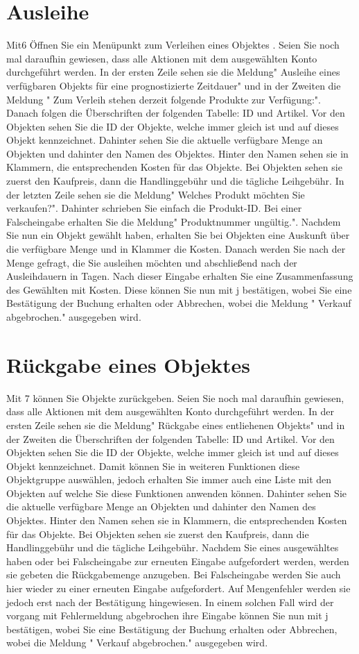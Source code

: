 ﻿\documentclass[a4paper,12pt,titlepage]{article}
\begin{document}
\section{Ausleihe}
Mit6 Öffnen Sie ein Menüpunkt zum Verleihen eines Objektes . Seien Sie noch mal daraufhin gewiesen, dass alle Aktionen mit dem ausgewählten Konto durchgeführt werden.
In der ersten Zeile sehen sie die Meldung" Ausleihe eines verfügbaren Objekts für eine prognostizierte Zeitdauer" und in der Zweiten die Meldung " Zum Verleih stehen derzeit folgende Produkte zur Verfügung:". Danach folgen die Überschriften der folgenden Tabelle: ID und Artikel.
Vor den Objekten sehen Sie die ID der Objekte, welche immer gleich ist und auf dieses Objekt kennzeichnet. 
Dahinter sehen Sie die aktuelle verfügbare Menge an Objekten und dahinter den Namen des Objektes.
Hinter den Namen sehen sie in Klammern, die entsprechenden Kosten für das Objekte. Bei Objekten sehen sie zuerst den Kaufpreis, dann die Handlinggebühr und die tägliche Leihgebühr.
In der letzten Zeile sehen sie die Meldung" Welches Produkt möchten Sie verkaufen?". Dahinter schrieben Sie einfach die Produkt-ID. Bei einer Falscheingabe erhalten Sie die Meldung" Produktnummer ungültig.".
Nachdem Sie nun ein Objekt gewählt haben, erhalten Sie bei Objekten eine Auskunft über die verfügbare Menge und in Klammer die Kosten. Danach werden Sie nach der Menge gefragt, die Sie ausleihen möchten und abschließend nach der Ausleihdauern in Tagen.
Nach dieser Eingabe erhalten Sie eine Zusammenfassung des Gewählten mit Kosten. 
Diese können Sie nun mit j bestätigen, wobei Sie eine Bestätigung der Buchung erhalten oder Abbrechen, wobei die Meldung " Verkauf abgebrochen." ausgegeben wird. 
\section{Rückgabe eines Objektes}
Mit 7 können Sie Objekte zurückgeben. Seien Sie noch mal daraufhin gewiesen, dass alle Aktionen mit dem ausgewählten Konto durchgeführt werden.
In der ersten Zeile sehen sie die Meldung" Rückgabe eines entliehenen Objekts" und in der Zweiten die Überschriften der folgenden Tabelle: ID und Artikel. 
Vor den Objekten sehen Sie die ID der Objekte, welche immer gleich ist und auf dieses Objekt kennzeichnet. Damit können Sie in weiteren Funktionen diese Objektgruppe auswählen, jedoch erhalten Sie immer auch eine Liste mit den Objekten auf welche Sie diese Funktionen anwenden können.
Dahinter sehen Sie die aktuelle verfügbare Menge an Objekten und dahinter den Namen des Objektes.
Hinter den Namen sehen sie in Klammern, die entsprechenden Kosten für das Objekte. Bei Objekten sehen sie zuerst den Kaufpreis, dann die Handlinggebühr und die tägliche Leihgebühr.
Nachdem Sie eines ausgewähltes  haben oder bei Falscheingabe zur erneuten Eingabe aufgefordert werden, werden sie gebeten die Rückgabemenge anzugeben. Bei Falscheingabe werden Sie auch hier wieder zu einer erneuten Eingabe aufgefordert. Auf Mengenfehler werden sie jedoch erst nach der Bestätigung hingewiesen. In einem solchen Fall wird der vorgang mit Fehlermeldung abgebrochen
ihre Eingabe können Sie nun mit j bestätigen, wobei Sie eine Bestätigung der Buchung erhalten oder Abbrechen, wobei die Meldung " Verkauf abgebrochen." ausgegeben wird. 
\end{document}
